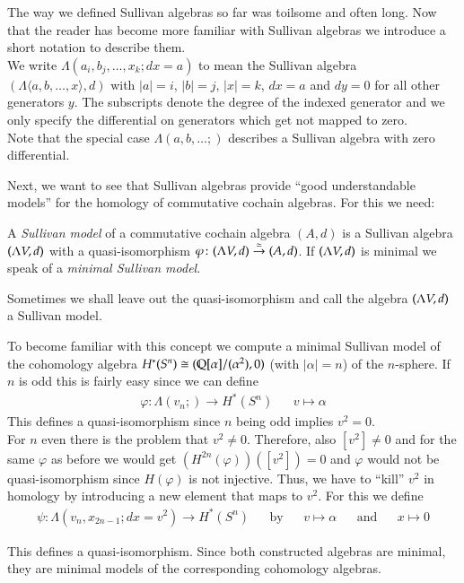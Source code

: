 \begin{Remark}
 The way we defined Sullivan algebras so far was toilsome and often long. Now that the reader has become more familiar
 with Sullivan algebras we introduce a short notation to describe them. \\
 We write $\Lambda (a_i , b_j, \ldots, x_k ; d x = a)$ to mean the Sullivan algebra
 $(\Lambda \langle a, b, \ldots, x \rangle , d) $ with $|a| = i$, $|b| = j$, $|x| = k$, $d x = a$ and
 $dy = 0 $ for all other generators $y$. The subscripts denote the degree of the indexed generator and
 we only specify the differential on generators which get not mapped to zero. \\
  Note that the special case $\Lambda(a,b, \ldots ;)$ describes a Sullivan algebra with zero differential.
\end{Remark}


Next, we want to see that Sullivan algebras provide ``good understandable models'' for the homology of 
commutative cochain algebras. For this we need:

\begin{Definition}
  A \emph{Sullivan model} of a commutative cochain algebra $(A,d)$ is a Sullivan algebra $(\Lambda V,d)$ with a quasi-isomorphism
  $\varphi \colon (\Lambda V,d) \overset{\simeq}{\to} (A,d)$. If $(\Lambda V,d)$ is minimal we speak of a 
  \emph{minimal Sullivan model}.
\end{Definition}
Sometimes we shall leave out the quasi-isomorphism and call the algebra $(\Lambda V,d)$ a Sullivan model.

\begin{Example}
\label{ex:MinimalModelOfSpheres}
 To become familiar with this concept we compute a minimal Sullivan model of the cohomology 
 algebra $H^*(S^n) \cong (\mathbb{Q} [\alpha] / (\alpha^2), 0)$ (with $|\alpha| = n$) of the
 $n$-sphere. If $n$ is odd this is fairly easy since we can define 
 \begin{align*}
  \varphi \colon \Lambda (v_n;) \to H^*(S^n) & & v \mapsto \alpha
 \end{align*}
 This defines a quasi-isomorphism since $n$ being odd implies
 $ v^2 = 0$. \\
 For $n$ even there is the problem that $v^2 \neq 0$. Therefore, also 
 $[v^2] \neq 0$ and for the same $\varphi$ as before we would get
 $(H^{2n}(\varphi)) ([v^2]) = 0$ and $\varphi$ would not be quasi-isomorphism since $H(\varphi)$ is not injective.
 Thus, we have to ``kill'' $v^2$
 in homology by introducing a new element that maps to $v^2$. For this we define
  \begin{align*}
  \psi \colon \Lambda(v_n, x_{2n -1}; dx = v^2) \to H^*(S^n)& & \text{by}  &&v \mapsto \alpha& &\text{and}& & x \mapsto 0 
 \end{align*}
 
 This defines a quasi-isomorphism. Since both constructed algebras are minimal, they are minimal models
 of the corresponding cohomology algebras.
\end{Example}

